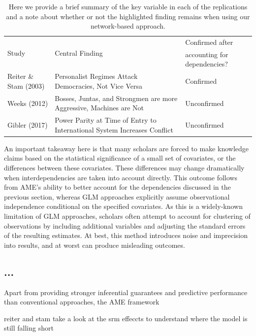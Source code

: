 \begin{table}[ht]
\centering
\caption{Here we provide a brief summary of the key variable in each of the replications and a note about whether or not the highlighted finding remains when using our network-based approach.}
	\begin{tabular}{l p{7cm} l} \toprule
		\multirow{2}{*}{Study} & \multirow{2}{*}{Central Finding} &  Confirmed after \\
		& &  accounting for dependencies? \\ \toprule
		Reiter \& Stam (2003) & Personalist Regimes Attack Democracies, Not Vice Versa & {Confirmed} \\ \midrule
		Weeks (2012) & Bosses, Juntas, and Strongmen are more Aggressive, Machines are Not & {Unconfirmed} \\\midrule
		Gibler (2017) & Power Parity at Time of Entry to International System Increases Conflict & {Unconfirmed}\\ \bottomrule
	\end{tabular}
	\label{tab:modelFindingSumm}
\end{table}

An important takeaway here is that many scholars are forced to make knowledge claims based on the statistical significance of a small set of covariates, or the differences between these covariates. These differences may change dramatically when interdependencies are taken into account directly. This outcome follows from AME's ability to better account for the dependencies discussed in the previous section, whereas GLM approaches explicitly assume observational independence conditional on the specified covariates. As this is a widely-known limitation of GLM approaches, scholars often attempt to account for clustering of observations by including additional variables and adjusting the standard errors of the resulting estimates. At best, this method introduces noise and imprecision into results, and at worst can produce misleading outcomes. 

\subsection{...}

Apart from providing stronger inferential guarantees and predictive performance than conventional approaches, the AME framework 

reiter and stam take a look at the srm effeccts to understand where the model is still falling short

